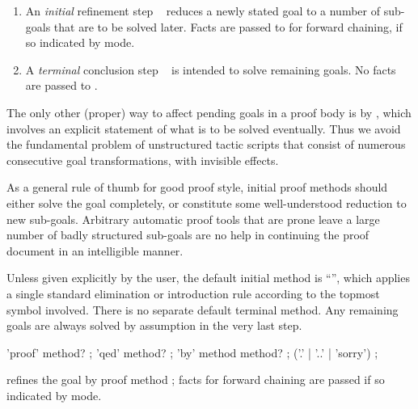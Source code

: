\begin{isabellebody}
\begin{isamarkuptext}
  \begin{enumerate}

  \item An \emph{initial} refinement step ~ reduces a newly stated goal to a number
  of sub-goals that are to be solved later.  Facts are passed to
   for forward chaining, if so indicated by  mode.
  
  \item A \emph{terminal} conclusion step ~ is intended to solve remaining goals.  No facts are
  passed to .

  \end{enumerate}

  The only other (proper) way to affect pending goals in a proof body
  is by , which involves an explicit statement of
  what is to be solved eventually.  Thus we avoid the fundamental
  problem of unstructured tactic scripts that consist of numerous
  consecutive goal transformations, with invisible effects.

  \medskip As a general rule of thumb for good proof style, initial
  proof methods should either solve the goal completely, or constitute
  some well-understood reduction to new sub-goals.  Arbitrary
  automatic proof tools that are prone leave a large number of badly
  structured sub-goals are no help in continuing the proof document in
  an intelligible manner.

  Unless given explicitly by the user, the default initial method is
  ``'', which applies a single standard elimination
  or introduction rule according to the topmost symbol involved.
  There is no separate default terminal method.  Any remaining goals
  are always solved by assumption in the very last step.

  \begin{rail}
    'proof' method?
    ;
    'qed' method?
    ;
    'by' method method?
    ;
    ('.' | '..' | 'sorry')
    ;
  \end{rail}

  \begin{descr}
  
  \item [\isa{\isacommand{proof}}~\isa{m\isactrlsub {\isadigit{1}}}] refines the goal by
  proof method ; facts for forward chaining are
  passed if so indicated by  mode.
  

\end{descr}
\end{isamarkuptext}
\end{isabellebody}
